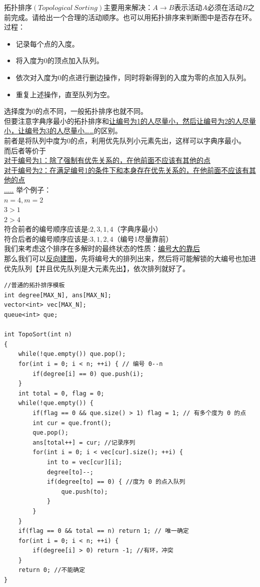 拓扑排序$(Topological\  Sorting)$主要用来解决：$A\rightarrow B$表示活动$A$必须在活动$B$之前完成。请给出一个合理的活动顺序。也可以用拓扑排序来判断图中是否存在环。 \\
过程：
\begin{itemize}
\item 记录每个点的入度。
\item 将入度为0的顶点加入队列。
\item 依次对入度为0的点进行删边操作，同时将新得到的入度为零的点加入队列。
\item 重复上述操作，直至队列为空。
\end{itemize}
选择度为0的点不同，一般拓扑排序也就不同。 \\
但要注意字典序最小的拓扑排序和\underline {让编号为1的人尽量小，然后让编号为2的人尽量小，让编号为3的人尽量小……}的区别。 \\
前者是将队列中度为0的点，利用优先队列小元素先出，这样可以字典序最小。 \\
而后者等价于\\
\underline {对于编号为1：除了强制有优先关系的，在他前面不应该有其他的点} \\
\underline {对于编号为2：在满足编号1的条件下和本身存在优先关系的，在他前面不应该有其他的点}\\
\underline {.....}
举个例子：\\
$n=4,m=2$ \\
$3>1$ \\
$2>4$ \\
符合前者的编号顺序应该是:$2,3,1,4$（字典序最小） \\
符合后者的编号顺序应该是:$3,1,2,4$（编号1尽量靠前） \\
我们来考虑这个排序在多解时的最终状态的性质：\underline {编号大的靠后} \\
那么我们可以\underline {反向建图}，先将编号大的排列出来，然后将可能解锁的大编号也加进优先队列【并且优先队列是大元素先出】，依次排列就好了。 \\

\begin{lstlisting}
//普通的拓扑排序模板
int degree[MAX_N], ans[MAX_N];
vector<int> vec[MAX_N];
queue<int> que;

int TopoSort(int n)
{
    while(!que.empty()) que.pop();
    for(int i = 0; i < n; ++i) { // 编号 0--n
        if(degree[i] == 0) que.push(i);
    }
    int total = 0, flag = 0;
    while(!que.empty()) {
        if(flag == 0 && que.size() > 1) flag = 1; // 有多个度为 0 的点
        int cur = que.front();
        que.pop();
        ans[total++] = cur; //记录序列
        for(int i = 0; i < vec[cur].size(); ++i) {
            int to = vec[cur][i];
            degree[to]--;
            if(degree[to] == 0) { //度为 0 的点入队列
                que.push(to);
            }
        }
    }
    if(flag == 0 && total == n) return 1; // 唯一确定
    for(int i = 0; i < n; ++i) {
        if(degree[i] > 0) return -1; //有环，冲突
    }
    return 0; //不能确定
}
\end{lstlisting}

